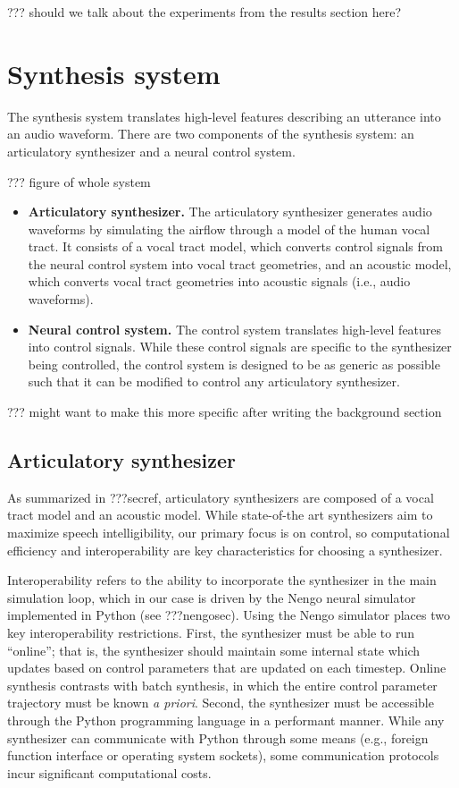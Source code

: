 ??? should we talk about the experiments from the results section here?

\section{Synthesis system}

The synthesis system translates
high-level features describing an utterance
into an audio waveform.
There are two components of the synthesis system:
an articulatory synthesizer and a neural control system.

??? figure of whole system

\begin{itemize}
\item \textbf{Articulatory synthesizer.} The articulatory synthesizer
  generates audio waveforms
  by simulating the airflow through a model of the human vocal tract.
  It consists of a vocal tract model,
  which converts control signals from the neural control system
  into vocal tract geometries,
  and an acoustic model,
  which converts vocal tract geometries into acoustic signals
  (i.e., audio waveforms).
\item \textbf{Neural control system.} The control system
  translates high-level features into control signals.
  While these control signals are specific to the
  synthesizer being controlled,
  the control system is designed to be as generic
  as possible such that it can be modified to control
  any articulatory synthesizer.
\end{itemize}

??? might want to make this more specific after writing
the background section

\subsection{Articulatory synthesizer}

As summarized in ???secref,
articulatory synthesizers are composed
of a vocal tract model and an acoustic model.
While state-of-the art synthesizers aim to
maximize speech intelligibility,
our primary focus is on control,
so computational efficiency
and interoperability are
key characteristics for choosing a synthesizer.

Interoperability refers to the ability
to incorporate the synthesizer
in the main simulation loop,
which in our case is driven by
the Nengo neural simulator
implemented in Python
(see ???nengosec).
Using the Nengo simulator places
two key interoperability restrictions.
First, the synthesizer must
be able to run ``online'';
that is, the synthesizer should maintain
some internal state which updates
based on control parameters
that are updated on each timestep.
Online synthesis contrasts with
batch synthesis, in which
the entire control parameter trajectory
must be known \textit{a priori}.
Second, the synthesizer must
be accessible through the Python
programming language in a performant manner.
While any synthesizer can communicate
with Python through some means
(e.g., foreign function interface
or operating system sockets),
some communication protocols incur
significant computational costs.

